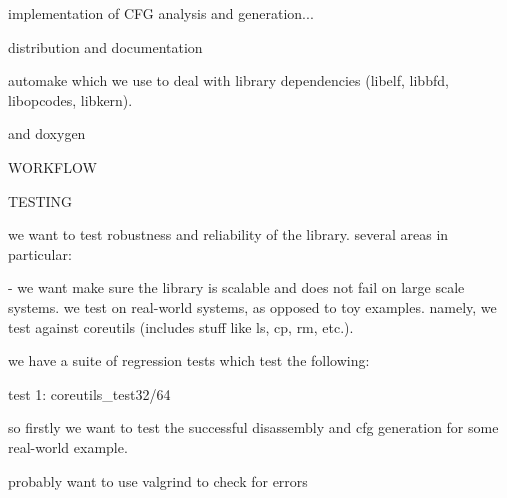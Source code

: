 implementation of CFG analysis and generation...

distribution and documentation

automake which we use to deal with library dependencies (libelf, libbfd, libopcodes, libkern).

 and doxygen

WORKFLOW



TESTING

we want to test robustness and reliability of the library. several areas in particular:

- we want make sure the library is scalable and does not fail on large scale systems. we test on real-world systems, as opposed to toy examples. namely, we test against coreutils (includes stuff like ls, cp, rm, etc.).

we have a suite of regression tests which test the following:

test 1: coreutils\_test32/64

so firstly we want to test the successful disassembly and cfg generation for some real-world example. 

probably want to use valgrind to check for errors